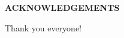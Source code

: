 \begin{center}
\vspace*{52pt}
{\normalfont \textbf{ACKNOWLEDGEMENTS}}
\end{center}

Thank you everyone!


\clearpage
